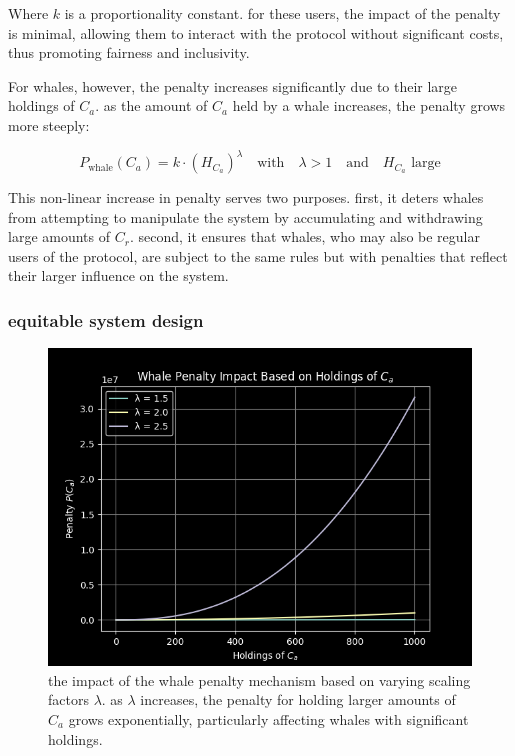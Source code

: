 \documentclass{article}
\begin{document}
Where $k$ is a proportionality constant. for these users, the impact of the penalty is minimal, allowing them to interact with the protocol without significant costs, thus promoting fairness and inclusivity.

For whales, however, the penalty increases significantly due to their large holdings of $C_a$. as the amount of $C_a$ held by a whale increases, the penalty grows more steeply:

\[
P_{\text{whale}}(C_a) = k \cdot \left(H_{C_a}\right)^\lambda \quad \text{with} \quad \lambda > 1 \quad \text{and} \quad H_{C_a} \text{ large}
\]

This non-linear increase in penalty serves two purposes. first, it deters whales from attempting to manipulate the system by accumulating and withdrawing large amounts of $C_r$. second, it ensures that whales, who may also be regular users of the protocol, are subject to the same rules but with penalties that reflect their larger influence on the system.

\subsubsection{equitable system design}


\begin{figure}[h]
\centering
\includegraphics[width=\textwidth]{images/6.png}
\caption{the impact of the whale penalty mechanism based on varying scaling factors $\lambda$. as $\lambda$ increases, the penalty for holding larger amounts of $C_a$ grows exponentially, particularly affecting whales with significant holdings.}
\label{fig:whale_penalty}
\end{figure}
\end{document}
